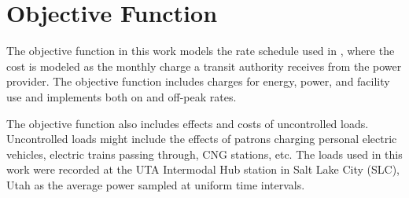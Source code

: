 \section{Objective Function}
The objective function in this work models the rate schedule used in \cite{noauthor_rocky_nodate}, where the cost is modeled as the monthly charge a transit authority receives from the power provider. The objective function includes charges for energy, power, and facility use and implements both on and off-peak rates.
\par The objective function also includes effects and costs of
uncontrolled loads. Uncontrolled loads might include the effects of
patrons charging personal electric vehicles, electric trains passing
through, CNG stations, etc. The loads used in this work were recorded
at the UTA Intermodal Hub station in Salt Lake City (SLC), Utah as the
average power sampled at uniform time intervals.
